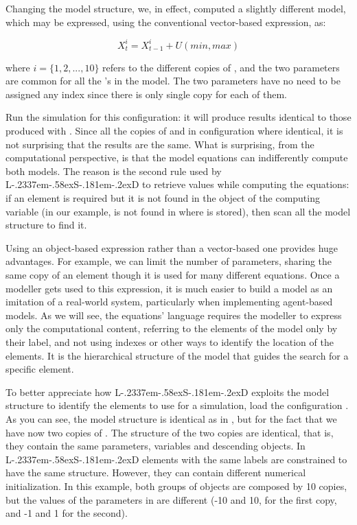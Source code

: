 \documentclass [11pt,a4paper] {book}
\def\LsD{{L\kern-.2337em\lower-.58ex\hbox{S}\kern-.181em\lower-.2ex\hbox{D}}\xspace}
\begin{document}
Changing the model structure, we, in effect, computed a slightly different model, which may be expressed, using the conventional vector-based expression, as:

\[
X^i_t=X^i_{t-1} + U(min, max)
\]

where $i=\{1, 2, ..., 10\}$ refers to the different copies of , and the two parameters are common for all the 's in the model. The two parameters have no need to be assigned any index since there is only single copy for each of them. 

Run the simulation for this configuration: it will produce results identical to those produced with . Since all the copies of  and  in configuration  where identical, it is not surprising that the results are the same. What is surprising, from the computational perspective, is that the model equations can indifferently compute both models. The reason is the second rule used by \LsD to retrieve values while computing the equations: if an element is required but it is not found in the object of the computing variable (in our example,  is not found in  where  is stored), then scan all the model structure to find it.

Using an object-based expression rather than a vector-based one provides huge advantages. For example, we can limit the number of parameters, sharing the same copy of an element though it is used for many different equations. Once a modeller gets used to this expression, it is much easier to build a model as an imitation of a real-world system, particularly when implementing agent-based models. As we will see, the equations' language requires the modeller to express only the computational content, referring to the elements of the model only by their label, and not using indexes or other ways to identify the location of the elements. It is the hierarchical structure of the model that guides the search for a specific element.

To better appreciate how \LsD exploits the model structure to identify the elements to use for a simulation, load the configuration . As you can see, the model structure is identical as in , but for the fact that we have now two copies of . The structure of the two copies are identical, that is, they contain the same parameters, variables and descending objects. In \LsD elements with the same labels are constrained to have the same structure. However, they can contain different numerical initialization. In this example, both groups of objects  are composed by 10 copies, but the values of the parameters in  are different (-10 and 10, for the first copy, and -1 and 1 for the second).
\end{document}
